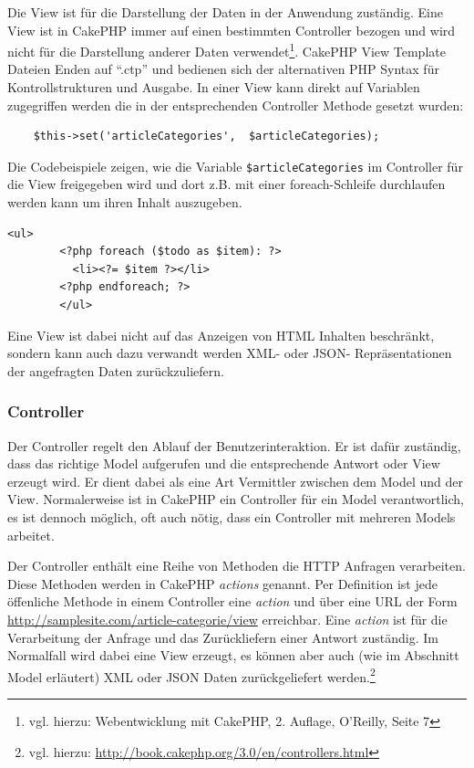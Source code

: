 	Die View ist für die Darstellung der Daten in der Anwendung zuständig. Eine View ist in CakePHP immer auf einen bestimmten Controller bezogen und wird nicht für die Darstellung anderer Daten verwendet\footnote{vgl. hierzu: Webentwicklung mit CakePHP, 2. Auflage, O'Reilly, Seite 7}. CakePHP View Template Dateien Enden auf \enquote{.ctp} und bedienen sich der alternativen PHP Syntax für Kontrollstrukturen und Ausgabe. 
	In einer View kann direkt auf Variablen zugegriffen werden die in der entsprechenden Controller Methode gesetzt wurden:\\ 
   \lstset{language=PHP} 
	\begin{lstlisting}
	$this->set('articleCategories',  $articleCategories);
	\end{lstlisting}
	  Die Codebeispiele zeigen, wie die Variable \texttt{\$articleCategories} im Controller für die View freigegeben wird und dort z.B. mit einer foreach-Schleife durchlaufen werden kann um ihren Inhalt auszugeben. 
		\lstset{language=PHP}
		\begin{lstlisting}[caption={Alternative PHP Syntax}] 	
		<ul>
	   	<?php foreach ($todo as $item): ?>
		  <li><?= $item ?></li>
		<?php endforeach; ?>
		</ul>
		\end{lstlisting}
	 Eine View ist dabei nicht auf das Anzeigen von HTML Inhalten beschränkt, sondern kann auch dazu verwandt werden XML- oder JSON- Repräsentationen der angefragten Daten zurückzuliefern.
	\subsubsection{Controller}
	Der Controller regelt den Ablauf der Benutzerinteraktion.
	Er ist dafür zuständig, dass das richtige Model aufgerufen und die entsprechende Antwort oder View erzeugt wird. Er dient dabei als eine Art Vermittler zwischen dem Model und der View. Normalerweise ist in CakePHP ein Controller für ein Model verantwortlich, es ist dennoch möglich, oft auch nötig, dass ein Controller mit mehreren Models arbeitet.
	
	Der Controller enthält eine Reihe von  Methoden die HTTP Anfragen verarbeiten. Diese Methoden werden in CakePHP \textit{actions} genannt. Per Definition ist jede öffenliche Methode in einem Controller eine \textit{action} und über eine URL der Form \url{http://samplesite.com/article-categorie/view} erreichbar.
	Eine \textit{action} ist für die Verarbeitung der Anfrage und das Zurückliefern einer Antwort zuständig. Im Normalfall wird dabei eine View erzeugt, es können aber auch (wie im Abschnitt Model erläutert) XML oder JSON Daten zurückgeliefert werden.\footnote{vgl. hierzu: \url{http://book.cakephp.org/3.0/en/controllers.html}}
	
